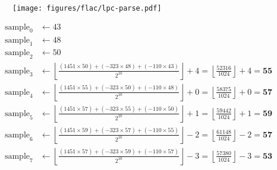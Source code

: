 \clearpage

\begin{figure}[h]
\texttt{[image: figures/flac/lpc-parse.pdf]}
\end{figure}
{
\begin{align*}
\text{sample}_0 &\leftarrow 43 \\
\text{sample}_1 &\leftarrow 48 \\
\text{sample}_2 &\leftarrow 50 \\
\text{sample}_3 &\leftarrow \left\lfloor\frac{(1451 \times 50) + (-323 \times 48) + (-110 \times 43)}{2 ^ {10}}\right\rfloor + 4 = \left\lfloor\frac{52316}{1024}\right\rfloor + 4 = \textbf{55} \\
\text{sample}_4 &\leftarrow \left\lfloor\frac{(1451 \times 55) + (-323 \times 50) + (-110 \times 48)}{2 ^ {10}}\right\rfloor + 0 = \left\lfloor\frac{58375}{1024}\right\rfloor + 0 = \textbf{57} \\
\text{sample}_5 &\leftarrow \left\lfloor\frac{(1451 \times 57) + (-323 \times 55) + (-110 \times 50)}{2 ^ {10}}\right\rfloor + 1 = \left\lfloor\frac{59442}{1024}\right\rfloor + 1 = \textbf{59} \\
\text{sample}_6 &\leftarrow \left\lfloor\frac{(1451 \times 59) + (-323 \times 57) + (-110 \times 55)}{2 ^ {10}}\right\rfloor - 2 = \left\lfloor\frac{61148}{1024}\right\rfloor - 2 = \textbf{57} \\
\text{sample}_7 &\leftarrow \left\lfloor\frac{(1451 \times 57) + (-323 \times 59) + (-110 \times 57)}{2 ^ {10}}\right\rfloor - 3 = \left\lfloor\frac{57380}{1024}\right\rfloor - 3 = \textbf{53} \\
\end{align*}
}

\clearpage

